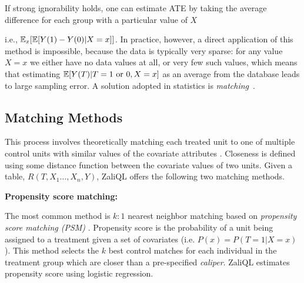 If strong ignorability holds, one can estimate ATE by
 taking the  average difference for each group with a particular value of $X$  i.e., $\mathbb{E}_x[\mathbb{E}[Y(1)-Y(0)| X=x]]$.
In practice, however, a direct application of this method is
impossible, because the data is typically very sparse: for any value
$X=x$ we either have no data values at all, or very few such values,
which means that estimating $\mathbb{E}[Y(T)|T=1\mbox{ or }0,X=x]$ as an
average from the database leads to large sampling error. A solution adopted in
statistics is {\em matching}~\cite{Rubin1983b}.


\subsection{Matching Methods}
\label{sec:algo}
This process involves theoretically matching each treated unit to one of multiple control units with similar values of the covariate attributes \cite{IacKinPor09}. Closeness is defined using some distance function between the covariate values of two units. Given a table, $R(T,X_1 \ldots,X_n,Y)$, ZaliQL offers the following two matching methods.

\newpage
{\bf Propensity score matching:}
\label{sec:nnm}
The most common method is $k:1$ nearest neighbor matching based on {\em propensity score matching (PSM)} \cite{Rubin1983b}. Propensity score is the probability of a unit being assigned to a treatment given a set of covariates (i.e. $P(x)=P(T=1|X=x)$). This method selects the $k$ best control matches for each individual in the treatment group which are closer than a pre-specified {
\em caliper}. ZaliQL estimates propensity score using logistic regression.


